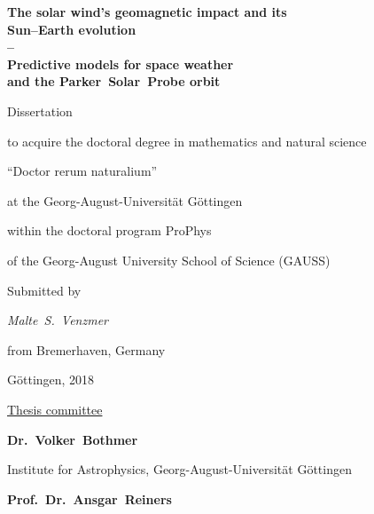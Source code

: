 
\begin{titlepage}
	\begin{center}
		\vspace*{\fill}
		{\LARGE\sffamily
			\textbf{The solar wind's geomagnetic impact and its\\Sun--Earth evolution\\--\\Predictive models for space weather\\and the Parker~Solar~Probe orbit}\\
		}
		\renewcommand{\baselinestretch}{1.5}

		\vspace{3\baselineskip}
		\Large\rmfamily
		Dissertation
		
		to acquire the doctoral degree in mathematics and natural science	%
		
		``Doctor rerum naturalium''
		
		at the Georg-August-Universität Göttingen
		
		\vspace{\baselineskip}
		within the doctoral program ProPhys
		
		of the Georg-August University School of Science (GAUSS)
		
		\vspace{3\baselineskip}
		Submitted by
		
		\textit{%
			Malte~S.~Venzmer
		}
		
		from Bremerhaven, Germany
		
		\vspace{3\baselineskip}
		Göttingen, 2018
		\vspace{\fill}
	\end{center}
\end{titlepage}

\newpage

\vspace*{\fill}

\noindent \underline{Thesis committee}
\vspace{\baselineskip}

\textbf{Dr.~Volker~Bothmer}

Institute for Astrophysics, Georg-August-Universität Göttingen
\vspace{\baselineskip}

\textbf{Prof.~Dr.~Ansgar~Reiners}

